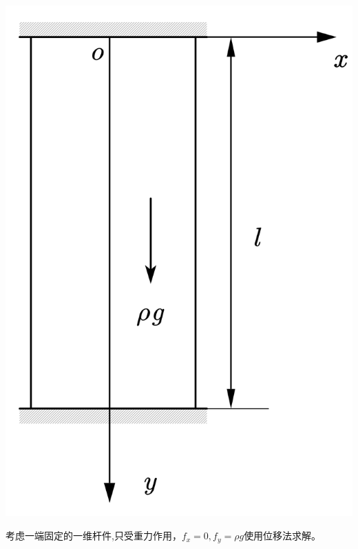 \centerline{\includegraphics[scale=0.4]{figure/2-8.png}}
\begin{example}
	考虑一端固定的一维杆件,只受重力作用，$f_x=0,f_y=\rho g$使用位移法求解。
\end{example}
